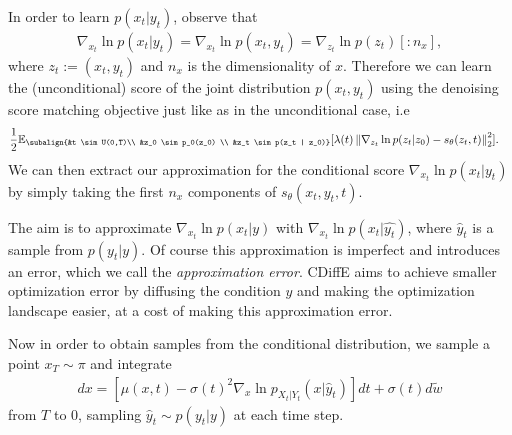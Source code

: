 In order to learn $p(x_t | y_t)$, observe that
\begin{gather*}
    \nabla_{x_t}\ln p(x_t | y_t) = \nabla_{x_t}\ln p(x_t, y_t) = \nabla_{z_t}\ln p(z_t)[:n_x],
\end{gather*}
where $z_t := (x_t, y_t)$ and $n_x$ is the dimensionality of $x$. Therefore we can learn the (unconditional) score of the joint distribution $p(x_t, y_t)$ using the denoising score matching objective just like as in the unconditional case, i.e
\begin{gather}
    \label{CDF}
\begin{aligned}
    &\frac{1}{2} \mathbb{E}_{\subalign{&t \sim U(0,T)\\ &z_0 \sim p_0(z_0) \\ &z_t \sim p(z_t | z_0)}} [\lambda(t) \norm{\nabla_{z_t} \ln{p(z_t |z_0)} - s_\theta(z_t,t)}_2^2].
\end{aligned}
\end{gather}
We can then extract our approximation for the conditional score $\nabla_{x_t} \ln p(x_t|y_t)$ by simply taking the first $n_x$ components of $s_\theta(x_t, y_t,t)$.

The aim is to approximate $\nabla_{x_t} \ln p(x_t | y)$ with $\nabla_{x_t} \ln p(x_t|\hat{y_t})$, where $\hat{y}_t$ is a sample from $p(y_t | y)$. Of course this approximation is imperfect and introduces an error, which we call the \textit{approximation error}. CDiffE aims to achieve smaller optimization error by diffusing the condition $y$ and making the optimization landscape easier, at a cost of making this approximation error.

Now in order to obtain samples from the conditional distribution, we sample a point $x_T \sim \pi$ and integrate
\begin{gather*}
    dx = [\mu(x,t) - \sigma(t)^2 \nabla_{x} \ln p_{X_t|Y_t}(x | \hat{y}_t)]dt + \sigma(t)d\tilde{w}
\end{gather*}
from $T$ to $0$, sampling $\hat{y}_t \sim p(y_t | y)$ at each time step.

